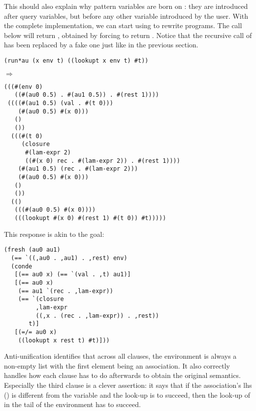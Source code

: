 This should also explain why pattern variables are born on : they are introduced after query variables, but before any other variable introduced by the user. With the complete implementation, we can start using  to rewrite programs. The call below will return , obtained by forcing  to return . Notice that the recursive call of  has been replaced by a fake one just like in the previous section.
\begin{lstlisting}
(run*au (x env t) ((lookupt x env t) #t))
\end{lstlisting}
$\Rightarrow$
\begin{lstlisting}
(((#(env 0) 
   ((#(au0 0.5) . #(au1 0.5)) . #(rest 1))))
 ((((#(au1 0.5) (val . #(t 0)))
    (#(au0 0.5) #(x 0)))
   ()
   ())
  (((#(t 0)
     (closure
      #(lam-expr 2)
      ((#(x 0) rec . #(lam-expr 2)) . #(rest 1))))
    (#(au1 0.5) (rec . #(lam-expr 2)))
    (#(au0 0.5) #(x 0)))
   ()
   ())
  (() 
   (((#(au0 0.5) #(x 0))))
   (((lookupt #(x 0) #(rest 1) #(t 0)) #t)))))
\end{lstlisting}
This response is akin to the goal:
\begin{lstlisting}
(fresh (au0 au1)
  (== `((,au0 . ,au1) . ,rest) env)
  (conde
   [(== au0 x) (== `(val . ,t) au1)]
   [(== au0 x)
    (== au1 `(rec . ,lam-expr))
    (== `(closure
         ,lam-expr
         ((,x . (rec . ,lam-expr)) . ,rest))
       t)]
   [(=/= au0 x)
    ((lookupt x rest t) #t)]))
\end{lstlisting}
Anti-unification identifies that across all clauses, the environment is always a non-empty list with the first element being an association. It also correctly handles how each clause has to do afterwards to obtain the original semantics. Especially the third clause is a clever assertion: it says that if the association's lhs () is different from the variable  and the look-up is to succeed, then the look-up of  in the tail of the environment has to succeed.